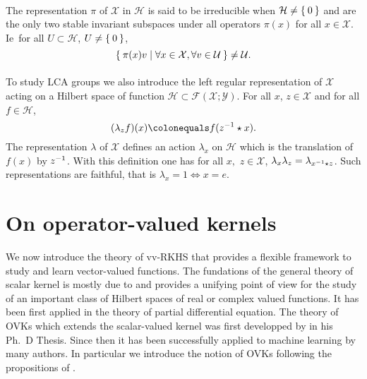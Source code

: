 \paragraph{}
The representation $\pi$ of $\mathcal{X}$ in $\mathcal{H}$ is said to be
irreducible when $\mathcal{H}\neq \Set{0}$ and are the only two stable
invariant subspaces under all operators $\pi(x)$ for all $x\in\mathcal{X}$.
\acs{Ie}~for all $ U\subset\mathcal{H}$, $U\neq \Set{0}$,
\begin{dmath*}
    \Set{\pi(x)v|\forall x\in\mathcal{X},\forall v\in\mathcal{U}}\neq \mathcal{U}.
\end{dmath*}
\paragraph{}
To study \ac{LCA} groups we also introduce the left regular representation of
$\mathcal{X}$ acting on a Hilbert space of function
$\mathcal{H}\subset\mathcal{F}(\mathcal{X};\mathcal{Y})$. For all $x$,
$z\in\mathcal{X}$ and for all $f\in\mathcal{H}$,
\begin{dmath*}
    (\lambda_z f)(x)\colonequals f(\inv{z}\groupop x).
\end{dmath*}
The representation $\lambda$ of $\mathcal{X}$ defines an action $\lambda_x$ on
$\mathcal{H}$ which is the translation of $f(x)$ by ${z}^{-1}$. With this
definition one has for all $x,$ $z\in\mathcal{X}$,
$\lambda_x\lambda_z=\lambda_{{x}^{-1}\star z}$. Such representations are
faithful, that is $\lambda_x=1 \iff x=e$.

\section{On operator-valued kernels}
\label{sec:background_on_operator-valued_kernels} We now introduce the theory
of \acf{vv-RKHS} that provides a flexible framework to study and learn
vector-valued functions. The fundations of the general theory of scalar kernel
is mostly due to \citet{Aronszajn1950}  and provides a unifying point of view
for the study of an important class of Hilbert spaces of real or complex valued
functions. It has been first applied in the theory of partial differential
equation. The theory of \acfp{OVK} which extends the scalar-valued kernel was
first developped by \citet{Pedrick57} in his Ph.~D Thesis. Since then it has
been successfully applied to machine learning by many authors. In particular we
introduce the notion of \aclp{OVK} following the propositions of
\citet{Micchelli2005,carmeli2006vector,Carmeli2010}.

